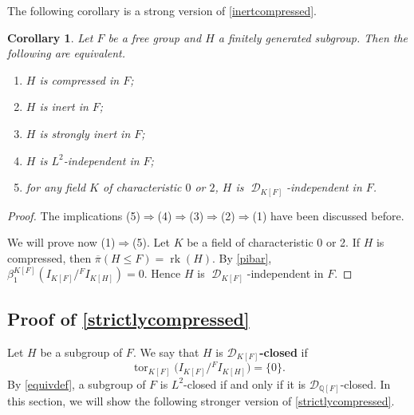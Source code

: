 \documentclass{amsart}
\newtheorem{cor}[lem]{Corollary}
\theoremstyle{definition}
\theoremstyle{remark}
\DeclareMathOperator{\D}{\mathcal D}
\DeclareMathOperator{\tor}{tor}
\DeclareMathOperator{\rk}{rk}
\newcommand{\bpi}{\overline{\pi}}
\begin{document}
 The following corollary is a strong version of \cref{inertcompressed}.
\begin{cor}\label{strcom}
Let $F$ be a free group and $H$ a finitely generated subgroup. Then the following are equivalent.
\begin{enumerate}
\item $H$ is compressed in $F$;
\item $H$ is inert in $F$;
\item $H$ is strongly inert in $F$;
\item $H$ is $L^2$-independent in $F$; 
\item for any field $K$ of characteristic $0$ or $2$, $H$ is $\D_{K[F]}$-independent in $F$.
\end{enumerate}
\end{cor}

\begin{proof}
The implications (5)$\Rightarrow$(4)$\Rightarrow$(3)$\Rightarrow$(2)$\Rightarrow$(1) have been discussed before. 

We will prove now (1)$\Rightarrow$(5). Let $K$ be a field of characteristic 0 or 2. If $H$ is compressed, then $\bpi(H\leq F)=\rk(H)$. By \cref{pibar}, $\beta_1^{K[F]}(I_{K[F]}/{}^FI_{K[H]})=0$. Hence $H$ is $\D_{K[F]}$-independent in $F$.
\end{proof}

\subsection{Proof of \cref{strictlycompressed}}
Let $H$ be a subgroup of $F$. We say that $H$ is \textbf{$\mathcal{D}_{K[F]}$-closed} if  
\[
\tor_{K[F]}\!\bigl(I_{K[F]}/{}^F I_{K[H]}\bigr) = \{0\}.
\]
By \cref{equivdef}, a subgroup of $F$ is $L^2$-closed if and only if it is $\mathcal{D}_{\mathbb{Q}[F]}$-closed.  
In this section, we will show the following stronger version of \cref{strictlycompressed}.
\end{document}

